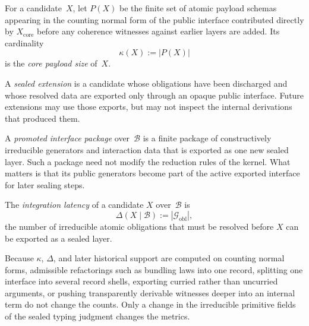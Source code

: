 \documentclass{lmcs}
\newcommand{\B}{\mathcal{B}}
\newcommand{\Gcal}{\mathcal{G}}
\begin{document}
\begin{defi}
\label{def:payload}
For a candidate~$X$, let $P(X)$ be the finite set of atomic payload schemas appearing in the counting normal form of the public interface contributed directly by $X_{\mathrm{core}}$ before any coherence witnesses against earlier layers are added. Its cardinality
\[
  \kappa(X) := |P(X)|
\]
is the \emph{core payload size} of~$X$.
\end{defi}

\begin{defi}
\label{def:sealed}
A \emph{sealed extension} is a candidate whose obligations have been discharged and whose resolved data are exported only through an opaque public interface. Future extensions may use those exports, but may not inspect the internal derivations that produced them.
\end{defi}

\begin{defi}
\label{def:promoted}
A \emph{promoted interface package} over~$\B$ is a finite package of constructively irreducible generators and interaction data that is exported as one new sealed layer. Such a package need not modify the reduction rules of the kernel. What matters is that its public generators become part of the active exported interface for later sealing steps.
\end{defi}

\begin{defi}
\label{def:latency}
The \emph{integration latency} of a candidate $X$ over~$\B$ is
\[
  \Delta(X \mid \B) := |\Gcal_{\mathrm{obl}}|,
\]
the number of irreducible atomic obligations that must be resolved before $X$ can be exported as a sealed layer.
\end{defi}

\begin{rem}
\label{rem:refactor-invariance}
Because $\kappa$, $\Delta$, and later historical support are computed on counting normal forms, admissible refactorings such as bundling laws into one record, splitting one interface into several record shells, exporting curried rather than uncurried arguments, or pushing transparently derivable witnesses deeper into an internal term do not change the counts. Only a change in the irreducible primitive fields of the sealed typing judgment changes the metrics.
\end{rem}
\end{document}
